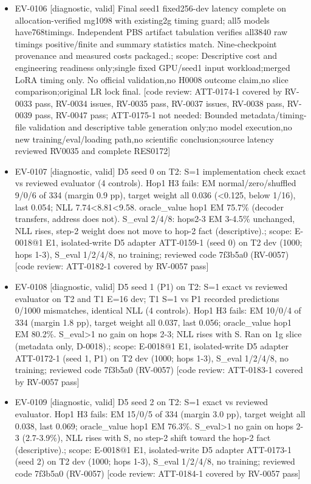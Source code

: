 \documentclass[11pt]{article}
\begin{document}
\begin{itemize}
\item EV-0106 [diagnostic, valid] Final seed1 fixed256-dev latency complete on allocation-verified mg1098 with existing2g timing guard; all5 models have768timings. Independent PBS artifact tabulation verifies all3840 raw timings positive/finite and summary statistics match. Nine-checkpoint provenance and measured costs packaged.; scope: Descriptive cost and engineering readiness only;single fixed GPU/seed1 input workload;merged LoRA timing only. No official validation,no H0008 outcome claim,no slice comparison;original LR lock final. [code review: ATT-0174-1 covered by RV-0033 pass, RV-0034 issues, RV-0035 pass, RV-0037 issues, RV-0038 pass, RV-0039 pass, RV-0047 pass; ATT-0175-1 not needed: Bounded metadata/timing-file validation and descriptive table generation only;no model execution,no new training/eval/loading path,no scientific conclusion;source latency reviewed RV0035 and complete RES0172]
\item EV-0107 [diagnostic, valid] D5 seed 0 on T2: S=1 implementation check exact vs reviewed evaluator (4 controls). Hop1 H3 fails: EM normal/zero/shuffled 9/0/6 of 334 (margin 0.9 pp), target weight all 0.036 (\textless{}0.125, below 1/16), last 0.054; NLL 7.74\textless{}8.81\textless{}9.58. oracle\_value hop1 EM 75.7\% (decoder transfers, address does not). S\_eval 2/4/8: hops2-3 EM 3-4.5\% unchanged, NLL rises, step-2 weight does not move to hop-2 fact (descriptive).; scope: E-0018@1 E1, isolated-write D5 adapter ATT-0159-1 (seed 0) on T2 dev (1000; hops 1-3), S\_eval 1/2/4/8, no training; reviewed code 7f3b5a0 (RV-0057) [code review: ATT-0182-1 covered by RV-0057 pass]
\item EV-0108 [diagnostic, valid] D5 seed 1 (P1) on T2: S=1 exact vs reviewed evaluator on T2 and T1 E=16 dev; T1 S=1 vs P1 recorded predictions 0/1000 mismatches, identical NLL (4 controls). Hop1 H3 fails: EM 10/0/4 of 334 (margin 1.8 pp), target weight all 0.037, last 0.056; oracle\_value hop1 EM 80.2\%. S\_eval\textgreater{}1 no gain on hops 2-3; NLL rises with S. Ran on 1g slice (metadata only, D-0018).; scope: E-0018@1 E1, isolated-write D5 adapter ATT-0172-1 (seed 1, P1) on T2 dev (1000; hops 1-3), S\_eval 1/2/4/8, no training; reviewed code 7f3b5a0 (RV-0057) [code review: ATT-0183-1 covered by RV-0057 pass]
\item EV-0109 [diagnostic, valid] D5 seed 2 on T2: S=1 exact vs reviewed evaluator. Hop1 H3 fails: EM 15/0/5 of 334 (margin 3.0 pp), target weight all 0.038, last 0.069; oracle\_value hop1 EM 76.3\%. S\_eval\textgreater{}1 no gain on hops 2-3 (2.7-3.9\%), NLL rises with S, no step-2 shift toward the hop-2 fact (descriptive).; scope: E-0018@1 E1, isolated-write D5 adapter ATT-0173-1 (seed 2) on T2 dev (1000; hops 1-3), S\_eval 1/2/4/8, no training; reviewed code 7f3b5a0 (RV-0057) [code review: ATT-0184-1 covered by RV-0057 pass]

\end{itemize}
\end{document}
